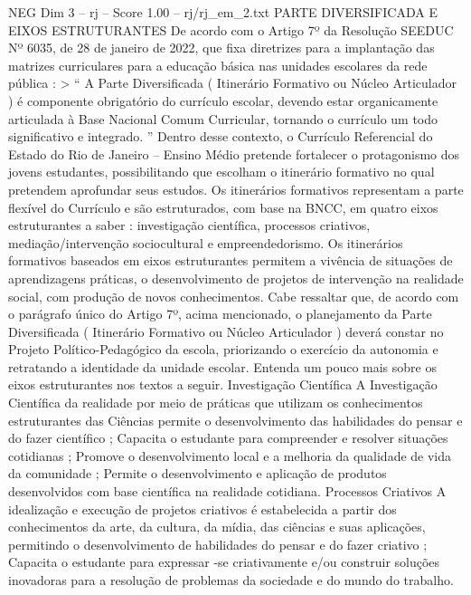\begin{textsample}{NEG Dim 3 – rj – Score 1.00 – rj/rj\_em\_2.txt}  \label{ex:f3_neg_277}
PARTE DIVERSIFICADA E EIXOS ESTRUTURANTES De acordo com o Artigo 7º da Resolução SEEDUC Nº 6035, de 28 de janeiro de 2022, que fixa diretrizes para a implantação das matrizes curriculares para a educação básica nas unidades escolares da rede pública : > “ A Parte Diversificada ( Itinerário Formativo ou Núcleo Articulador ) é componente obrigatório do currículo escolar, devendo estar organicamente articulada à Base Nacional Comum Curricular, tornando o currículo um todo significativo e integrado. ” Dentro desse contexto, o Currículo Referencial do Estado do Rio de Janeiro – Ensino Médio pretende fortalecer o protagonismo dos jovens estudantes, possibilitando que escolham o itinerário formativo no qual pretendem aprofundar seus estudos.
Os itinerários formativos representam a parte flexível do Currículo e são estruturados, com base na BNCC, em quatro eixos estruturantes a saber : investigação científica, processos criativos, mediação/intervenção sociocultural e empreendedorismo.
Os itinerários formativos baseados em eixos estruturantes permitem a vivência de situações de aprendizagens práticas, o desenvolvimento de projetos de intervenção na realidade social, com produção de novos conhecimentos.
Cabe ressaltar que, de acordo com o parágrafo único do Artigo 7º, acima mencionado, o planejamento da Parte Diversificada ( Itinerário Formativo ou Núcleo Articulador ) deverá constar no Projeto Político-Pedagógico da escola, priorizando o exercício da autonomia e retratando a identidade da unidade escolar.
Entenda um pouco mais sobre os eixos estruturantes nos textos a seguir.
Investigação Científica A Investigação Científica da realidade por meio de práticas que utilizam os conhecimentos estruturantes das Ciências permite o desenvolvimento das habilidades do pensar e do fazer científico ; Capacita o estudante para compreender e resolver situações cotidianas ; Promove o desenvolvimento local e a melhoria da qualidade de vida da comunidade ; Permite o desenvolvimento e aplicação de produtos desenvolvidos com base científica na realidade cotidiana.
Processos Criativos A idealização e execução de projetos criativos é estabelecida a partir dos conhecimentos da arte, da cultura, da mídia, das ciências e suas aplicações, permitindo o desenvolvimento de habilidades do pensar e do fazer criativo ; Capacita o estudante para expressar -se criativamente e/ou construir soluções inovadoras para a resolução de problemas da sociedade e do mundo do trabalho.

\end{textsample}
